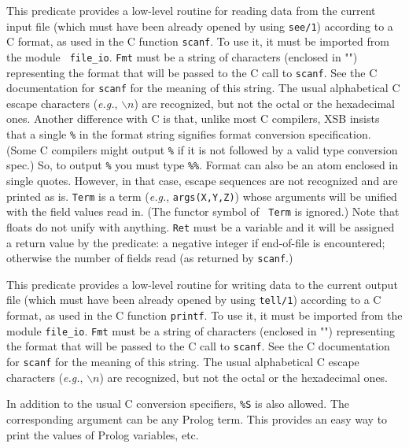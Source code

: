 \begin{description}

    This predicate provides a low-level routine for reading data from
    the current input file (which must have been already opened by using
    {\tt see/1}) according to a C format, as used in the C function
    {\tt scanf}. To use it, it must be imported from the module {\tt
    file\_io}.  {\tt Fmt} must be a string of characters (enclosed in "")
    representing the format that 
    will be passed to the C call to {\tt scanf}.  See the C
    documentation for {\tt scanf} for the meaning of this string.
    The usual alphabetical C escape characters ({\it e.g.}, $\backslash n$)
    are recognized, but not the octal or the hexadecimal ones.
    Another difference with C is that, unlike most C compilers, XSB insists
    that a single {\tt \%} in the format string signifies format conversion
    specification. (Some C compilers might output {\tt \%} if it is not
    followed by a valid type conversion spec.) So, to output {\tt \%}
    you must type {\tt \%\%}.
    Format can also be an atom enclosed in single quotes. However, in that
    case, escape sequences are not recognized and are printed as is.
    {\tt Term} is a term ({\it e.g.}, {\tt args(X,Y,Z)})  whose arguments
    will be unified with the field values read in.  (The functor symbol of {\tt
    Term} is ignored.)  Note that floats do not unify with anything.
    {\tt Ret} must be a variable and it will be assigned a return value by
    the predicate: a negative integer if end-of-file is encountered;
    otherwise the number of fields read (as returned by {\tt scanf}.)

    This predicate provides a low-level routine for writing data to
    the current output file (which must have been already opened by using
    {\tt tell/1}) according to a C format, as used in the C function
    {\tt printf}.
    To use it, it must be imported from the module {\tt file\_io}.
    {\tt Fmt} must be a string of characters (enclosed in "")
    representing the format that 
    will be passed to the C call to {\tt scanf}.  See the C
    documentation for {\tt scanf} for the meaning of this string.
    The usual alphabetical C escape characters ({\it e.g.}, $\backslash n$)
    are recognized, but not the octal or the hexadecimal ones.

    In addition to the usual C conversion specifiers, {\tt \%S} is also
    allowed. The corresponding argument can be any Prolog term. This
    provides an easy way to print the values of Prolog variables, etc.


\end{description}
